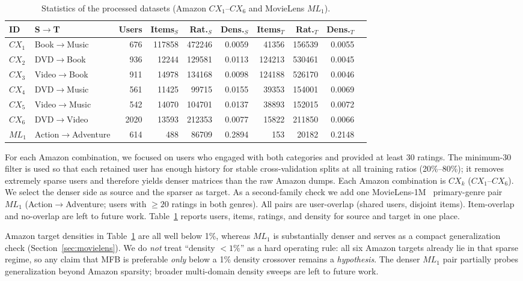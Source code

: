 \documentclass[pdflatex,sn-mathphys-num]{sn-jnl}%
\theoremstyle{thmstyleone}%
\theoremstyle{thmstyletwo}%
\theoremstyle{thmstylethree}%
\begin{document}
\begin{table}[!htbp]
\centering
\caption{Statistics of the processed datasets (Amazon $CX_1$--$CX_6$ and MovieLens $ML_1$).}
\label{tab:dataset_desc}
\renewcommand{\arraystretch}{1.12}
\setlength{\tabcolsep}{2.5pt}
\scriptsize
\begin{tabular}{llrrrrrrrr}
\toprule
\textbf{ID} & \textbf{S$\to$T} & \textbf{Users} & \textbf{Items$_S$} & \textbf{Rat.$_S$} & \textbf{Dens.$_S$} & \textbf{Items$_T$} & \textbf{Rat.$_T$} & \textbf{Dens.$_T$} \\
\midrule
$CX_1$ & Book$\to$Music & 676 & 117858 & 472246 & 0.0059 & 41356 & 156539 & 0.0055 \\
$CX_2$ & DVD$\to$Book & 936 & 12244 & 129581 & 0.0113 & 124213 & 530461 & 0.0045 \\
$CX_3$ & Video$\to$Book & 911 & 14978 & 134168 & 0.0098 & 124188 & 526170 & 0.0046 \\
$CX_4$ & DVD$\to$Music & 561 & 11425 & 99715 & 0.0155 & 39353 & 154001 & 0.0069 \\
$CX_5$ & Video$\to$Music & 542 & 14070 & 104701 & 0.0137 & 38893 & 152015 & 0.0072 \\
$CX_6$ & DVD$\to$Video & 2020 & 13593 & 212353 & 0.0077 & 15822 & 211850 & 0.0066 \\
$ML_1$ & Action$\to$Adventure & 614 & 488 & 86709 & 0.2894 & 153 & 20182 & 0.2148 \\
\bottomrule
\end{tabular}
\end{table}

For each Amazon combination, we focused on users who engaged with both categories and provided at least 30 ratings. The minimum-30 filter is used so that each retained user has enough history for stable cross-validation splits at all training ratios (20\%--80\%); it removes extremely sparse users and therefore yields denser matrices than the raw Amazon dumps. Each Amazon combination is $CX_k$ ($CX_1$--$CX_6$). We select the denser side as source and the sparser as target. As a second-family check we add one MovieLens-1M~\cite{harper2015movielens} primary-genre pair $ML_1$ (Action$\to$Adventure; users with $\ge 20$ ratings in both genres). All pairs are user-overlap (shared users, disjoint items). Item-overlap and no-overlap are left to future work. Table~\ref{tab:dataset_desc} reports users, items, ratings, and density for source and target in one place.

Amazon target densities in Table~\ref{tab:dataset_desc} are all well below 1\%, whereas $ML_1$ is substantially denser and serves as a compact generalization check (Section~\ref{sec:movielens}). We do \emph{not} treat ``density $<1\%$'' as a hard operating rule: all six Amazon targets already lie in that sparse regime, so any claim that MFB is preferable \emph{only} below a 1\% density crossover remains a \emph{hypothesis}. The denser $ML_1$ pair partially probes generalization beyond Amazon sparsity; broader multi-domain density sweeps are left to future work.
\end{document}
